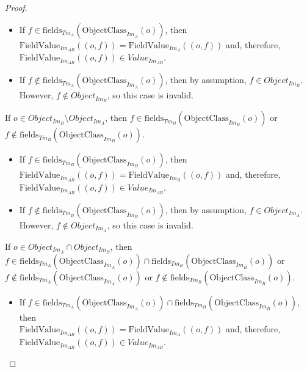 \begin{proof}
\begin{itemize}
    \begin{itemize}
        \item If $f \in \mathrm{fields}_{Tm_{A}}(\mathrm{ObjectClass}_{Im_{A}}(o))$, then $\mathrm{FieldValue}_{Im_{AB}}(( o, f )) = \mathrm{FieldValue}_{Im_{A}}(( o, f ))$ and, therefore, $\mathrm{FieldValue}_{Im_{AB}}(( o, f )) \in Value_{Im_{AB}}$.
        
        \item If $f \not\in \mathrm{fields}_{Tm_{A}}(\mathrm{ObjectClass}_{Im_{A}}(o))$, then by assumption, $f \in Object_{Im_B}$. However, $f \not\in Object_{Im_B}$, so this case is invalid.
    \end{itemize}
    
    If $o \in Object_{Im_B} \setminus Object_{Im_A}$, then $f \in \mathrm{fields}_{Tm_{B}}(\mathrm{ObjectClass}_{Im_{B}}(o))$ or \\$f \not\in \mathrm{fields}_{Tm_{B}}(\mathrm{ObjectClass}_{Im_{B}}(o))$.
    
    \begin{itemize}
        \item If $f \in \mathrm{fields}_{Tm_{B}}(\mathrm{ObjectClass}_{Im_{B}}(o))$, then $\mathrm{FieldValue}_{Im_{AB}}(( o, f )) = \mathrm{FieldValue}_{Im_{B}}(( o, f ))$ and, therefore, $\mathrm{FieldValue}_{Im_{AB}}(( o, f )) \in Value_{Im_{AB}}$.
        
        \item If $f \not\in \mathrm{fields}_{Tm_{B}}(\mathrm{ObjectClass}_{Im_{B}}(o))$, then by assumption, $f \in Object_{Im_A}$. However, $f \not\in Object_{Im_A}$, so this case is invalid.
    \end{itemize}
    
    If $o \in Object_{Im_A} \cap Object_{Im_B}$, then \\$f \in \mathrm{fields}_{Tm_{A}}(\mathrm{ObjectClass}_{Im_{A}}(o)) \cap \mathrm{fields}_{Tm_{B}}(\mathrm{ObjectClass}_{Im_{B}}(o))$ or \\$f \not\in \mathrm{fields}_{Tm_{A}}(\mathrm{ObjectClass}_{Im_{A}}(o))$ or $f \not\in \mathrm{fields}_{Tm_{B}}(\mathrm{ObjectClass}_{Im_{B}}(o))$.
    
    \begin{itemize}
        \item If $f \in \mathrm{fields}_{Tm_{A}}(\mathrm{ObjectClass}_{Im_{A}}(o)) \cap \mathrm{fields}_{Tm_{B}}(\mathrm{ObjectClass}_{Im_{B}}(o))$, then \\$\mathrm{FieldValue}_{Im_{AB}}(( o, f )) = \mathrm{FieldValue}_{Im_{A}}(( o, f ))$ and, therefore, \\$\mathrm{FieldValue}_{Im_{AB}}(( o, f )) \in Value_{Im_{AB}}$.
        

\end{itemize}
\end{itemize}
\end{proof}
